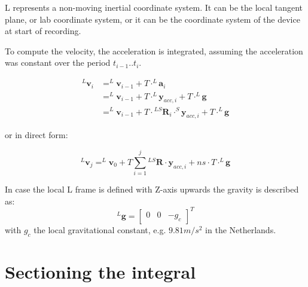 \documentclass{article}
\begin{document}
L represents a non-moving inertial coordinate system. It can be the local tangent plane,  or lab coordinate system, or it can be the coordinate system of the device at start of recording.

To compute the velocity, the acceleration is integrated, assuming the acceleration was constant over the period $t_{i-1}..t_i$.

\begin{equation} \label{eq:acceleration_integration}
\begin{aligned}
^L\textbf{v}_i &= ^L\textbf{v}_{i-1} + T \cdot ^L\boldsymbol{a}_i \\
&=  ^L\textbf{v}_{i-1} + T \cdot ^L\boldsymbol{y}_{acc,i} + T \cdot ^L \boldsymbol{g} \\
&=  ^L\textbf{v}_{i-1} + T \cdot{}^{LS}\boldsymbol{R}_i \cdot ^S\boldsymbol{y}_{acc,i} + T \cdot ^L \boldsymbol{g}
\end{aligned} 
\end{equation}

or in direct form:

\begin{equation} \label{eq:acceleration_integration_sum}
^L\textbf{v}_{j}= ^L\textbf{v}_0 + T \sum_{i=1}^{j} {}^{LS}\boldsymbol{R} \cdot \boldsymbol{y}_{acc,i} +ns \cdot T \cdot ^L\boldsymbol{g}
\end{equation}

In case the local L frame is defined with Z-axis upwards  the gravity is described as:
\begin{equation} \label{eq:gravity_down}
^L\textbf{g} = \begin{bmatrix} 0 & 0 & -g_c \end{bmatrix}^T
\end{equation}
with $g_c$ the local gravitational constant, e.g. $9.81 m/s^2$ in the Netherlands.

\section{Sectioning the integral}
\end{document}
